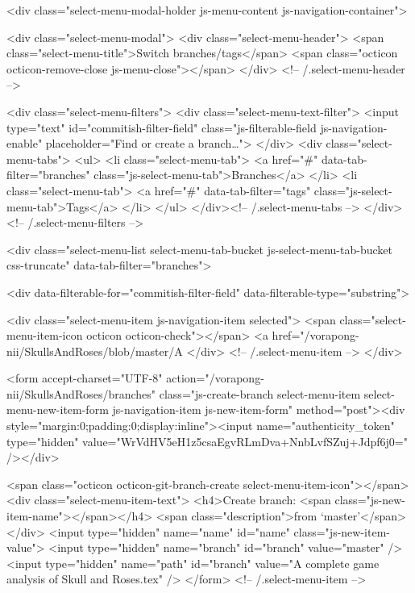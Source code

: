      <div class="select-menu-modal-holder js-menu-content js-navigation-container">

        <div class="select-menu-modal">
          <div class="select-menu-header">
            <span class="select-menu-title">Switch branches/tags</span>
            <span class="octicon octicon-remove-close js-menu-close"></span>
          </div> <!-- /.select-menu-header -->

          <div class="select-menu-filters">
            <div class="select-menu-text-filter">
              <input type="text" id="commitish-filter-field" class="js-filterable-field js-navigation-enable" placeholder="Find or create a branch…">
            </div>
            <div class="select-menu-tabs">
              <ul>
                <li class="select-menu-tab">
                  <a href="#" data-tab-filter="branches" class="js-select-menu-tab">Branches</a>
                </li>
                <li class="select-menu-tab">
                  <a href="#" data-tab-filter="tags" class="js-select-menu-tab">Tags</a>
                </li>
              </ul>
            </div><!-- /.select-menu-tabs -->
          </div><!-- /.select-menu-filters -->

          <div class="select-menu-list select-menu-tab-bucket js-select-menu-tab-bucket css-truncate" data-tab-filter="branches">

            <div data-filterable-for="commitish-filter-field" data-filterable-type="substring">

                <div class="select-menu-item js-navigation-item selected">
                  <span class="select-menu-item-icon octicon octicon-check"></span>
                  <a href="/vorapong-nii/SkullsAndRoses/blob/master/A%
                </div> <!-- /.select-menu-item -->
            </div>

              <form accept-charset="UTF-8" action="/vorapong-nii/SkullsAndRoses/branches" class="js-create-branch select-menu-item select-menu-new-item-form js-navigation-item js-new-item-form" method="post"><div style="margin:0;padding:0;display:inline"><input name="authenticity_token" type="hidden" value="WrVdHV5eH1z5csaEgvRLmDva+NnbLvfSZuj+Jdpf6j0=" /></div>

                <span class="octicon octicon-git-branch-create select-menu-item-icon"></span>
                <div class="select-menu-item-text">
                  <h4>Create branch: <span class="js-new-item-name"></span></h4>
                  <span class="description">from ‘master’</span>
                </div>
                <input type="hidden" name="name" id="name" class="js-new-item-value">
                <input type="hidden" name="branch" id="branch" value="master" />
                <input type="hidden" name="path" id="branch" value="A complete game analysis of Skull and Roses.tex" />
              </form> <!-- /.select-menu-item -->

